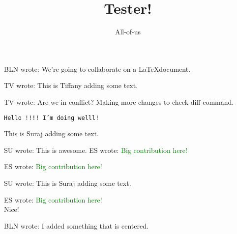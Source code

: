 \documentclass[12pt]{article}
\title{Tester!}
\author{All-of-us}
\newcommand{\bln}[1]{BLN wrote: \textcolor{red!70!blue!70}{#1}}
\newcommand{\tv}[1]{TV wrote: \textcolor{blue!70}{#1}}
\newcommand{\su}[1]{SU wrote: \textcolor{green!70}{#1}}
\newcommand{\es}[1]{ES wrote: \textcolor{green}{#1}}
\begin{document}
\maketitle

\bln{We're going to collaborate on a \LaTeX document.}

\tv{This is Tiffany adding some text.}

\tv{Are we in conflict? Making more changes to check diff command.}

\tt Hello !!!! I'm doing welll!



{This is Suraj adding some text.}

\su{This is awesome.}
\es{Big contribution here!}




\es{Big contribution here!}


\su{This is Suraj adding some text.}

\es{Big contribution here!}\\
{Nice!}




\begin{center}
  \bln{I added something that is centered.}
\end{center}
\end{document}
